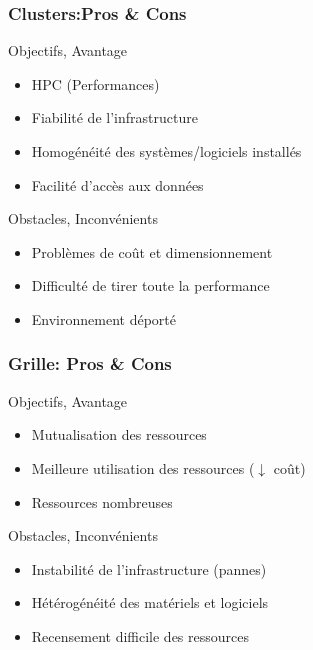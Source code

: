 \documentclass{beamer}
\begin{document}

\begin{frame}
\frametitle{Clusters:Pros \& Cons }

  \begin{block}{Objectifs, Avantage}
    \begin{itemize}
		\item HPC (Performances)
    		\item Fiabilité de l'infrastructure
		\item Homogénéité des systèmes/logiciels installés
		\item Facilité d'accès aux données
    	\end{itemize}
  \end{block}
  \pause
  \begin{block}{Obstacles, Inconvénients}
    \begin{itemize}
		\item Problèmes de coût et dimensionnement
    		\item Difficulté de tirer toute la performance
		\item Environnement déporté
    	\end{itemize}
  \end{block}
\end{frame}


\begin{frame}
\frametitle{Grille: Pros \& Cons }

  \begin{block}{Objectifs, Avantage}
    \begin{itemize}
		\item Mutualisation des ressources  
    		\item Meilleure utilisation des ressources ($\downarrow$ coût)
		\item Ressources nombreuses
    	\end{itemize}
  \end{block}
  \pause
  \begin{block}{Obstacles, Inconvénients}
    \begin{itemize}
		\item Instabilité de l'infrastructure (pannes)
    		\item Hétérogénéité des matériels et logiciels
		\item Recensement difficile des ressources
    	\end{itemize}
  \end{block}
\end{frame}
\end{document}

